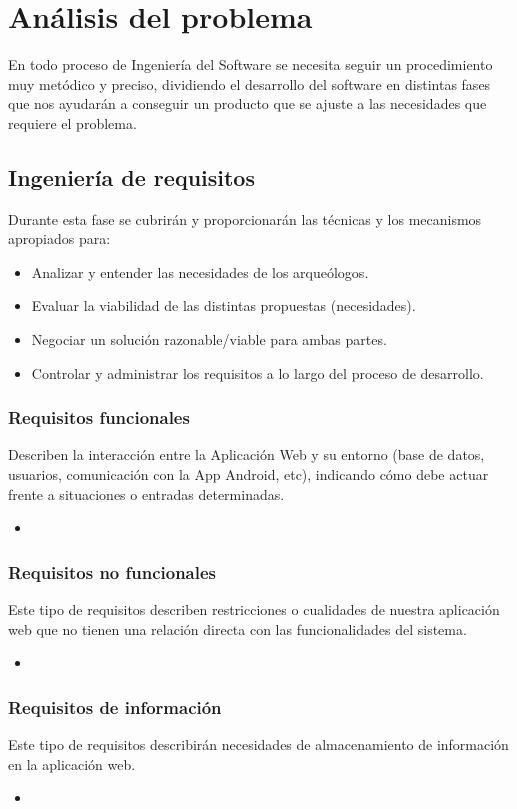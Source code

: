 \chapter{Análisis del problema}
 
En todo proceso de Ingeniería del Software se necesita seguir un procedimiento muy metódico
y preciso, dividiendo el desarrollo del software en distintas fases que nos ayudarán a
conseguir un producto que se ajuste a las necesidades que requiere el problema.

\section{Ingeniería de requisitos}
Durante esta fase se cubrirán y proporcionarán las técnicas y los mecanismos apropiados
para:

    \begin{itemize}
        \item Analizar y entender las necesidades de los arqueólogos.
        \item Evaluar la viabilidad de las distintas propuestas (necesidades).
        \item Negociar un solución razonable/viable para ambas partes.
        \item Controlar y administrar los requisitos a lo largo del proceso de desarrollo.
    \end{itemize}

\subsection{Requisitos funcionales}
Describen la interacción entre la Aplicación Web y su entorno (base de datos, usuarios, 
comunicación con la App Android, etc), indicando cómo debe actuar
frente a situaciones o entradas determinadas.

    \begin{itemize}
        \item 
    \end{itemize}

\subsection{Requisitos no funcionales}
Este tipo de requisitos describen restricciones o cualidades de nuestra aplicación web que
no tienen una relación directa con las funcionalidades del sistema.

    \begin{itemize}
        \item 
    \end{itemize}

\subsection{Requisitos de información}
Este tipo de requisitos describirán necesidades de almacenamiento de información en
la aplicación web.

    \begin{itemize}
        \item 
    \end{itemize}
